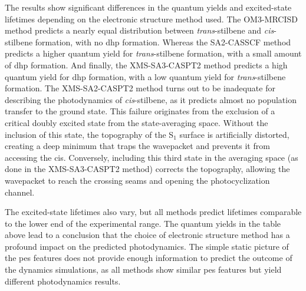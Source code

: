 The results show significant differences in the quantum yields and excited-state lifetimes depending on the electronic structure method used. The OM3-MRCISD method predicts a nearly equal distribution between \textit{trans}-stilbene and \textit{cis}-stilbene formation, with no \gls{dhp} formation. Whereas the SA2-CASSCF method predicts a higher quantum yield for \textit{trans}-stilbene formation, with a small amount of \gls{dhp} formation. And finally, the XMS-SA3-CASPT2 method predicts a high quantum yield for \gls{dhp} formation, with a low quantum yield for \textit{trans}-stilbene formation. The XMS-SA2-CASPT2 method turns out to be inadequate for describing the photodynamics of \textit{cis}-stilbene, as it predicts almost no population transfer to the ground state. This failure originates from the exclusion of a critical doubly excited state from the state-averaging space. Without the inclusion of this state, the topography of the S$_1$ surface is artificially distorted, creating a deep minimum that traps the wavepacket and prevents it from accessing the \glspl{ci}. Conversely, including this third state in the averaging space (as done in the XMS-SA3-CASPT2 method) corrects the topography, allowing the wavepacket to reach the crossing seams and opening the photocyclization channel.

The excited-state lifetimes also vary, but all methods predict lifetimes comparable to the lower end of the experimental range. The quantum yields in the table above lead to a conclusion that the choice of electronic structure method has a profound impact on the predicted photodynamics. The simple static picture of the \gls{pes} features does not provide enough information to predict the outcome of the dynamics simulations, as all methods show similar \gls{pes} features but yield different photodynamics results.

